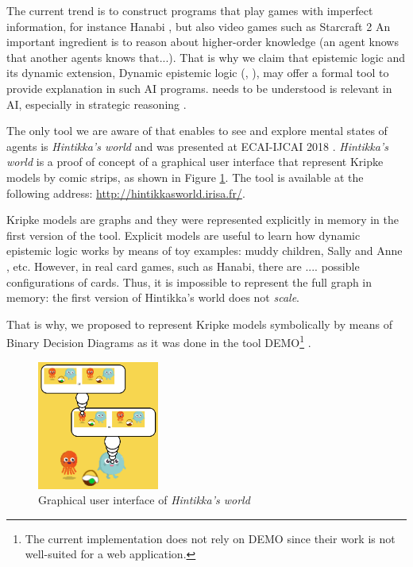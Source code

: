 The current trend is to construct programs that play games with imperfect information, for instance Hanabi \cite{DBLP:journals/corr/abs-1902-00506}, but also video games such as Starcraft 2 \cite{DBLP:conf/ijcai/HuLLPX18} An important ingredient is to reason about higher-order knowledge (an agent knows that another agents knows that...). That is why we claim that epistemic logic and its dynamic extension, Dynamic epistemic logic (\cite{baltag1998logic}, \cite{DitmarschvdHoekKooi}), may offer a formal tool to provide explanation in such AI programs. needs to be understood is relevant in AI, especially in strategic reasoning \cite{DBLP:journals/ijgt/Aumann99}.

The only tool we are aware of that enables to see and explore mental states of agents is \emph{Hintikka's world} and was presented at ECAI-IJCAI 2018 \cite{DBLP:conf/ijcai/Schwarzentruber18}. 
\emph{Hintikka's world} is a proof of concept of a graphical user interface that represent Kripke models by  comic strips, as shown in Figure \ref{figure:gui}. The tool is available at the following address:
\url{http://hintikkasworld.irisa.fr/}. 


Kripke models are graphs and they were represented explicitly in memory in the first version of the tool. Explicit models are useful to learn how dynamic epistemic logic works by means of toy examples: muddy children, Sally and Anne  \cite{wimmer1983beliefs}, etc.  However, in real card games, such as Hanabi, there are .... possible configurations of cards. Thus, it is impossible to represent the full graph in memory:  the first version of Hintikka's world does not \emph{scale}. 

That is why, we proposed to represent Kripke models symbolically by means of Binary Decision Diagrams as it was done in the tool DEMO\footnote{The current implementation does not rely on DEMO since their work is not well-suited for a web application.}  \cite{DBLP:conf/lori/BenthemEGS15}. 





\begin{figure}
	\begin{center}
		\includegraphics[width=4cm]{screenshot.png}
	\end{center}
	\caption{Graphical user interface of \emph{Hintikka's world}\label{figure:gui}}
\end{figure}
